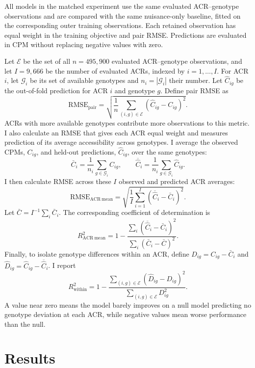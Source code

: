 \documentclass[10pt]{article}
\begin{document}
All models in the matched experiment use the same evaluated ACR--genotype observations and
are compared with the same nuisance-only baseline, fitted on the
corresponding outer training observations. Each retained observation
has equal weight in the training objective and pair RMSE. Predictions
are evaluated in CPM without replacing negative values with zero.

Let $\mathcal E$ be the set of all $n=495,900$ evaluated ACR--genotype
observations, and let $I=9,666$ be the number of evaluated ACRs,
indexed by $i=1,\ldots,I$. For ACR $i$, let $\mathcal G_i$ be its set
of available genotypes and $n_i=|\mathcal G_i|$ their number. Let
$\widehat C_{ig}$ be the out-of-fold prediction for ACR $i$ and
genotype $g$. Define pair RMSE as
\[
\mathrm{RMSE}_{\mathrm{pair}}=
\sqrt{\frac1n\sum_{(i,g)\in\mathcal E}(\widehat C_{ig}-C_{ig})^2}.
\]
ACRs with more available genotypes contribute more observations to
this metric. I also calculate an RMSE that gives each ACR
equal weight and measures prediction of its average accessibility
across genotypes. I average the observed CPMs, $C_{ig}$, and held-out predictions,
$\widehat C_{ig}$, over the same genotypes:
\[
\bar C_i=\frac1{n_i}\sum_{g\in\mathcal G_i}C_{ig},
\qquad
\overline{\widehat C}_i=
\frac1{n_i}\sum_{g\in\mathcal G_i}\widehat C_{ig}.
\]
I then calculate RMSE across these $I$ observed and predicted
ACR averages:
\[
\mathrm{RMSE}_{\mathrm{ACR\ mean}}
=
\sqrt{\frac1I\sum_{i=1}^{I}
(\overline{\widehat C}_i-\bar C_i)^2}.
\]
Let $\bar C=I^{-1}\sum_i\bar C_i$. The corresponding coefficient of determination is
\[
R^2_{\mathrm{ACR\ mean}}=1-
\frac{\sum_i(\overline{\widehat C}_i-\bar C_i)^2}{\sum_i(\bar C_i-\bar C)^2}.
\]
Finally, to isolate genotype differences within an ACR, define $D_{ig}=C_{ig}-\bar C_i$ and $\widehat D_{ig}=\widehat C_{ig}-\overline{\widehat C}_i$. I report
\[
R^2_{\mathrm{within}}=1-
\frac{\sum_{(i,g)\in\mathcal E}(\widehat D_{ig}-D_{ig})^2}
{\sum_{(i,g)\in\mathcal E}D_{ig}^2}.
\]
A value near zero means the model barely improves on a null model predicting no genotype deviation at each ACR, while negative values mean worse performance than the null. 


\FloatBarrier

\section{Results}
\end{document}
